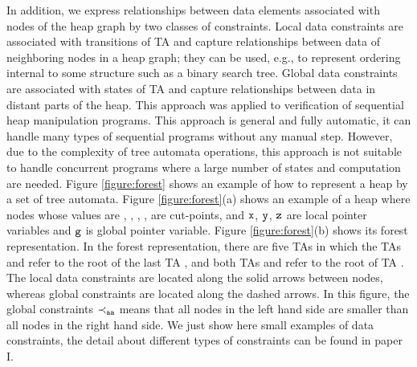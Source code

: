 In addition, we express relationships between data elements associated with nodes of the heap graph by two classes of constraints. Local data constraints are associated with transitions of TA and capture relationships between data of neighboring nodes in a heap graph; they can be used, e.g., to represent ordering internal to some structure such as a binary search tree. Global data constraints are associated with states of TA and capture relationships between data in distant parts of the heap. This approach was applied to verification of sequential heap manipulation programs. This approach is general and fully automatic, it can handle many types of sequential programs without any manual step. However, due to the complexity of tree automata operations, this approach is not suitable to handle concurrent programs where a large number of states and computation are needed. Figure \ref{figure:forest} shows an example of how to represent a heap by a set of tree automata. Figure \ref{figure:forest}(a) shows an example of a heap where nodes whose values are \nodea, \nodeb, \nodec, \noded, \nodee \; are cut-points, and $\tt x$, $\tt y$, $\tt z$ are local pointer variables and $\tt g$ is global pointer variable. Figure \ref{figure:forest}(b) shows its forest representation. In the forest representation, there are five TAs in which the TAs \taa \; and \tac \; refer to the root of the last TA \tae\;, and both TAs \tab \; and \tad \; refer to the root of TA \tac \;. The local data constraints are located along the solid arrows between nodes, whereas global constraints are located along the dashed arrows. In this figure, the global constraints $\tt \prec_{aa}$ means that all nodes in the left hand side are smaller than all nodes in the right hand side. We just show here small examples of data constraints, the detail about different types of constraints can be found in paper I.   

